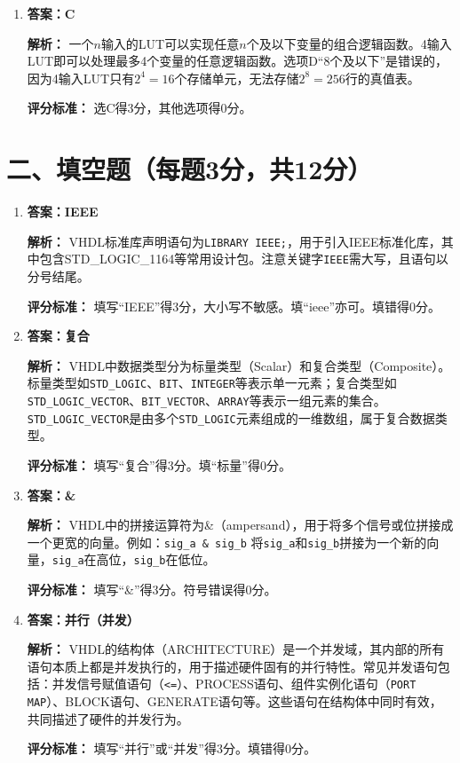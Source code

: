 \begin{enumerate}[label=\arabic*.]
\textbf{评分标准：} 选B得3分，其他选项得0分。

\item \textbf{答案：C}

\textbf{解析：} 一个$n$输入的LUT可以实现任意$n$个及以下变量的组合逻辑函数。4输入LUT即可以处理最多4个变量的任意逻辑函数。选项D“8个及以下”是错误的，因为4输入LUT只有$2^4=16$个存储单元，无法存储$2^8=256$行的真值表。

\textbf{评分标准：} 选C得3分，其他选项得0分。

\end{enumerate}

\section{二、填空题（每题3分，共12分）}

\begin{enumerate}[label=\arabic*.]

\item \textbf{答案：IEEE}

\textbf{解析：} VHDL标准库声明语句为\texttt{LIBRARY IEEE;}，用于引入IEEE标准化库，其中包含STD\_LOGIC\_1164等常用设计包。注意关键字\texttt{IEEE}需大写，且语句以分号结尾。

\textbf{评分标准：} 填写“IEEE”得3分，大小写不敏感。填“ieee”亦可。填错得0分。

\item \textbf{答案：复合}

\textbf{解析：} VHDL中数据类型分为标量类型（Scalar）和复合类型（Composite）。标量类型如\texttt{STD\_LOGIC}、\texttt{BIT}、\texttt{INTEGER}等表示单一元素；复合类型如\texttt{STD\_LOGIC\_VECTOR}、\texttt{BIT\_VECTOR}、\texttt{ARRAY}等表示一组元素的集合。\texttt{STD\_LOGIC\_VECTOR}是由多个\texttt{STD\_LOGIC}元素组成的一维数组，属于复合数据类型。

\textbf{评分标准：} 填写“复合”得3分。填“标量”得0分。

\item \textbf{答案：\&}

\textbf{解析：} VHDL中的拼接运算符为\&（ampersand），用于将多个信号或位拼接成一个更宽的向量。例如：\texttt{sig\_a \& sig\_b} 将\texttt{sig\_a}和\texttt{sig\_b}拼接为一个新的向量，\texttt{sig\_a}在高位，\texttt{sig\_b}在低位。

\textbf{评分标准：} 填写“\&”得3分。符号错误得0分。

\item \textbf{答案：并行（并发）}

\textbf{解析：} VHDL的结构体（ARCHITECTURE）是一个并发域，其内部的所有语句本质上都是并发执行的，用于描述硬件固有的并行特性。常见并发语句包括：并发信号赋值语句（\texttt{<=}）、PROCESS语句、组件实例化语句（\texttt{PORT MAP}）、BLOCK语句、GENERATE语句等。这些语句在结构体中同时有效，共同描述了硬件的并发行为。

\textbf{评分标准：} 填写“并行”或“并发”得3分。填错得0分。

\end{enumerate}

